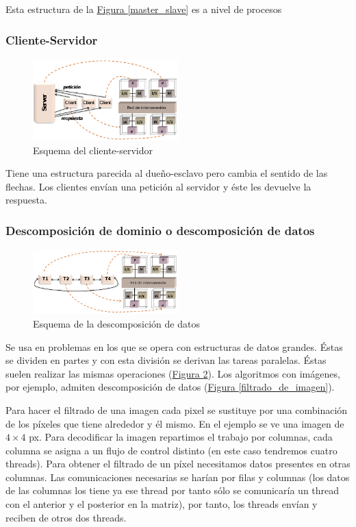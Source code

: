 \documentclass[10pt,a4paper,spanish]{report}
\begin{document}
Esta estructura de la \hyperref[master_slave]{Figura \ref*{master_slave}} es a nivel de procesos

\textcolor[rgb]{0.2,0.4,0.8}{\subsubsection{Cliente-Servidor}}
\begin{figure}[!h]
    \centering
    \includegraphics[width=0.5\textwidth]{36}
    \caption{Esquema del cliente-servidor}
    \label{cliente_servidor}
\end{figure}

Tiene una estructura parecida al dueño-esclavo pero cambia el sentido de las flechas. Los clientes envían una petición al servidor y éste les devuelve la respuesta.

\textcolor[rgb]{0.2,0.4,0.8}{\subsubsection{Descomposición de dominio o descomposición de datos}}
\begin{figure}[!h]
    \centering
    \includegraphics[width=0.5\textwidth]{37}
    \caption{Esquema de la descomposición de datos}
    \label{descomposicion_datos}
\end{figure}

Se usa en problemas en los que se opera con estructuras de datos grandes. Éstas se dividen en partes y con esta división se derivan las tareas paralelas. Éstas suelen realizar las mismas operaciones (\hyperref[descomposicion_datos]{Figura \ref*{descomposicion_datos}}). Los algoritmos con imágenes, por ejemplo, admiten descomposición de datos (\hyperref[filtrado_de_imagen]{Figura \ref*{filtrado_de_imagen}}).

Para hacer el filtrado de una imagen cada pixel se sustituye por una combinación de los píxeles que tiene alrededor y él mismo. En el ejemplo se ve una imagen de $4 \times 4$ px. Para decodificar la imagen repartimos el trabajo por columnas, cada columna se asigna a un flujo de control distinto (en este caso tendremos cuatro threads). Para obtener el filtrado de un píxel necesitamos datos presentes en otras columnas. Las comunicaciones necesarias se harían por filas y columnas (los datos de las columnas los tiene ya ese thread por tanto sólo se comunicaría un thread con el anterior y el posterior en la matriz), por tanto, los threads envían y reciben de otros dos threads.
\end{document}

